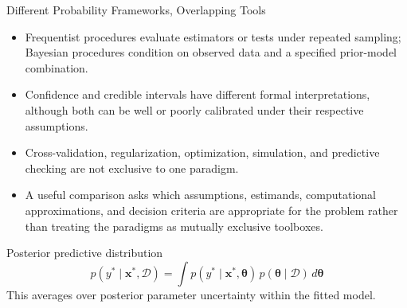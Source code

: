 \documentclass[aspectratio=169,11pt]{beamer}
\newcommand{\btheta}{\boldsymbol{\theta}}
\newcommand{\bx}{\mathbf{x}}
\begin{document}
\begin{frame}{Different Probability Frameworks, Overlapping Tools}
  \begin{itemize}
    \item Frequentist procedures evaluate estimators or tests under repeated sampling; Bayesian procedures condition on observed data and a specified prior-model combination.
    \item Confidence and credible intervals have different formal interpretations, although both can be well or poorly calibrated under their respective assumptions.
    \item Cross-validation, regularization, optimization, simulation, and predictive checking are not exclusive to one paradigm.
    \item A useful comparison asks which assumptions, estimands, computational approximations, and decision criteria are appropriate for the problem rather than treating the paradigms as mutually exclusive toolboxes.
  \end{itemize}

  \begin{block}{Posterior predictive distribution}
    \[p(y^*\mid\bx^*,\mathcal{D}) = \int p(y^*\mid\bx^*,\btheta)\,p(\btheta\mid\mathcal{D})\,d\btheta\]
    This averages over posterior parameter uncertainty within the fitted model.
  \end{block}
\end{frame}
\end{document}
